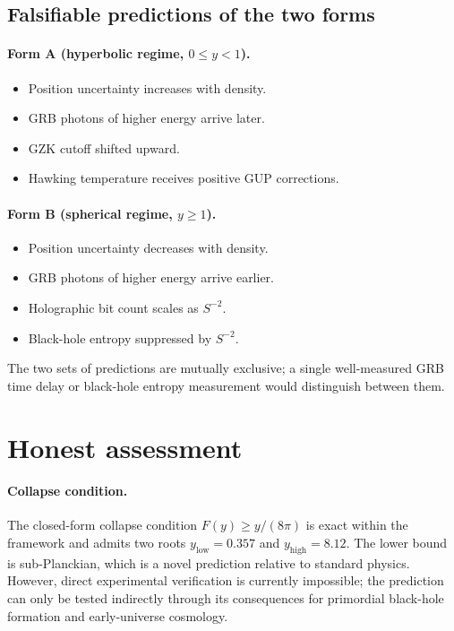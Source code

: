 \documentclass[a4paper,1pt,oneside,openany]{book}
\begin{document}
\subsection{Falsifiable predictions of the two forms}

\paragraph{Form A (hyperbolic regime, $0\le y<1$).}
\begin{itemize}
\item Position uncertainty increases with density.
\item GRB photons of higher energy arrive later.
\item GZK cutoff shifted upward.
\item Hawking temperature receives positive GUP corrections.
\end{itemize}

\paragraph{Form B (spherical regime, $y\ge 1$).}
\begin{itemize}
\item Position uncertainty decreases with density.
\item GRB photons of higher energy arrive earlier.
\item Holographic bit count scales as $S^{-2}$.
\item Black-hole entropy suppressed by $S^{-2}$.
\end{itemize}

The two sets of predictions are mutually exclusive; a single 
well-measured GRB time delay or black-hole entropy measurement 
would distinguish between them.

\section{Honest assessment}

\paragraph{Collapse condition.}
The closed-form collapse condition $F(y)\geq y/(8\pi)$ is exact 
within the framework and admits two roots $y_{\text{low}}=0.357$ 
and $y_{\text{high}}=8.12$. The lower bound is sub-Planckian, 
which is a novel prediction relative to standard physics. 
However, direct experimental verification is currently 
impossible; the prediction can only be tested indirectly 
through its consequences for primordial black-hole formation 
and early-universe cosmology.
\end{document}
